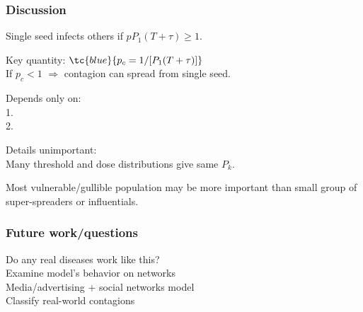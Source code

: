 \begin{frame}
  \frametitle{Discussion}

  Single seed infects others if $p P_1 (T + \tau) \ge 1$.

  Key quantity: $\tc{blue}{p_c = 1/[P_1 (T + \tau)]}$\\

  If $p_c < 1$ $\Rightarrow$ contagion can spread from single seed.
  
  Depends only on:\\
  1. \\
  2. 

  Details unimportant:\\
  Many threshold and dose distributions give same $P_k$.

   Most vulnerable/gullible population may be more important than
  small group of super-spreaders or influentials.

\end{frame}

\begin{frame}
  \frametitle{Future work/questions}
   Do any real diseases work like this?\\
  \mbox{}\newline
   Examine model's behavior on networks\\
  \mbox{}\newline
   Media/advertising + social networks model\\
  \mbox{}\newline
   Classify real-world contagions

\end{frame}


